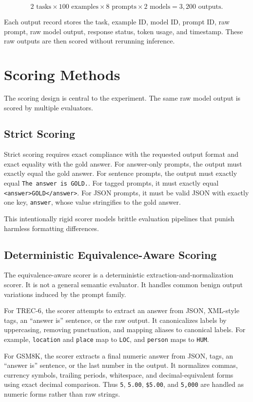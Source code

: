 \documentclass[11pt]{article}
\begin{document}
\[
2 \text{ tasks} \times 100 \text{ examples} \times 8 \text{ prompts} \times 2 \text{ models}
= 3{,}200 \text{ outputs}.
\]

Each output record stores the task, example ID, model ID, prompt ID, raw prompt, raw model output, response status, token usage, and timestamp. These raw outputs are then scored without rerunning inference.

\section{Scoring Methods}

The scoring design is central to the experiment. The same raw model output is scored by multiple evaluators.

\subsection{Strict Scoring}

Strict scoring requires exact compliance with the requested output format and exact equality with the gold answer. For answer-only prompts, the output must exactly equal the gold answer. For sentence prompts, the output must exactly equal \texttt{The answer is GOLD.}. For tagged prompts, it must exactly equal \texttt{<answer>GOLD</answer>}. For JSON prompts, it must be valid JSON with exactly one key, \texttt{answer}, whose value stringifies to the gold answer.

This intentionally rigid scorer models brittle evaluation pipelines that punish harmless formatting differences.

\subsection{Deterministic Equivalence-Aware Scoring}

The equivalence-aware scorer is a deterministic extraction-and-normalization scorer. It is not a general semantic evaluator. It handles common benign output variations induced by the prompt family.

For TREC-6, the scorer attempts to extract an answer from JSON, XML-style tags, an ``answer is'' sentence, or the raw output. It canonicalizes labels by uppercasing, removing punctuation, and mapping aliases to canonical labels. For example, \texttt{location} and \texttt{place} map to \texttt{LOC}, and \texttt{person} maps to \texttt{HUM}.

For GSM8K, the scorer extracts a final numeric answer from JSON, tags, an ``answer is'' sentence, or the last number in the output. It normalizes commas, currency symbols, trailing periods, whitespace, and decimal-equivalent forms using exact decimal comparison. Thus \texttt{5}, \texttt{5.00}, \texttt{\$5.00}, and \texttt{5,000} are handled as numeric forms rather than raw strings.
\end{document}

